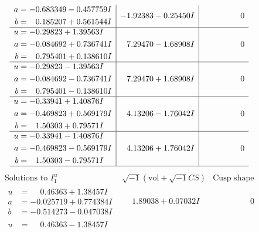 \documentclass[1p]{elsarticle_modified}
\theoremstyle{definition}
\newcommand{\I}{\sqrt{-1}}
\begin{document}
$$\begin{array}{c|c|c}
\begin{aligned}
a &= -0.683349 - 0.457759 I \\
b &= \phantom{-}0.185207 + 0.561544 I\end{aligned}
 & -1.92383 - 0.25450 I & \phantom{-0.000000 } 0 \\ \hline\begin{aligned}
u &= -0.29823 + 1.39563 I \\
a &= -0.084692 + 0.736741 I \\
b &= \phantom{-}0.795401 + 0.138610 I\end{aligned}
 & \phantom{-}7.29470 - 1.68908 I & \phantom{-0.000000 } 0 \\ \hline\begin{aligned}
u &= -0.29823 - 1.39563 I \\
a &= -0.084692 - 0.736741 I \\
b &= \phantom{-}0.795401 - 0.138610 I\end{aligned}
 & \phantom{-}7.29470 + 1.68908 I & \phantom{-0.000000 } 0 \\ \hline\begin{aligned}
u &= -0.33941 + 1.40876 I \\
a &= -0.469823 + 0.569179 I \\
b &= \phantom{-}1.50303 + 0.79571 I\end{aligned}
 & \phantom{-}4.13206 - 1.76042 I & \phantom{-0.000000 } 0 \\ \hline\begin{aligned}
u &= -0.33941 - 1.40876 I \\
a &= -0.469823 - 0.569179 I \\
b &= \phantom{-}1.50303 - 0.79571 I\end{aligned}
 & \phantom{-}4.13206 + 1.76042 I & \phantom{-0.000000 } 0\\
 \hline 
 \end{array}$$\newpage$$\begin{array}{c|c|c}  
\text{Solutions to }I^u_{1}& \I (\text{vol} + \sqrt{-1}CS) & \text{Cusp shape}\\
 \hline 
\begin{aligned}
u &= \phantom{-}0.46363 + 1.38457 I \\
a &= -0.025719 + 0.774384 I \\
b &= -0.514273 - 0.047038 I\end{aligned}
 & \phantom{-}1.89038 + 0.07032 I & \phantom{-0.000000 } 0 \\ \hline\begin{aligned}
u &= \phantom{-}0.46363 - 1.38457 I \\

\end{aligned}
\end{array}$$
\end{document}
